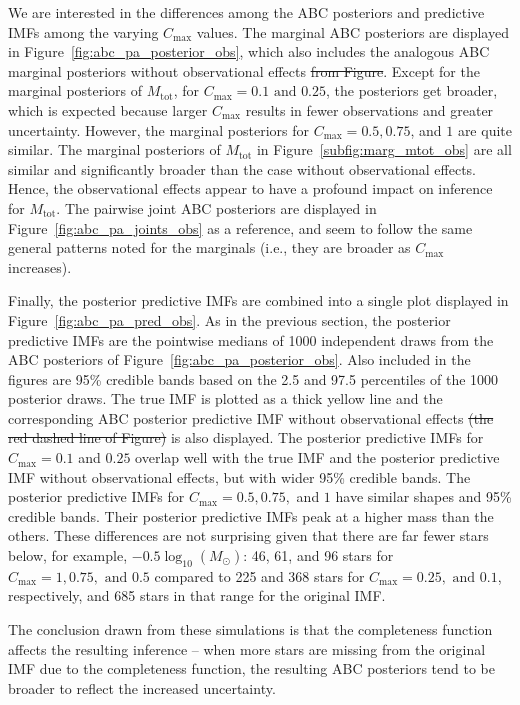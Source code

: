 \documentclass[ejs]{imsart}
\numberwithin{equation}{section}
\theoremstyle{plain}
\newcommand{\remove}[1]{\st{#1}}
\newcommand{\Msun}{M_{\odot}}
\newcommand{\Cmax}{C_{\text{max}}}
\newcommand{\Mtot}{M_{\text{tot}}}
\begin{document}
We are interested in the differences among the ABC posteriors and predictive IMFs among the varying $\Cmax$ values.  
The marginal ABC posteriors are displayed in Figure~\ref{fig:abc_pa_posterior_obs}, which also includes the analogous ABC marginal posteriors without observational effects \remove{from Figure}.  
Except for the marginal posteriors of $\Mtot$, for $\Cmax = 0.1 \text{ and } 0.25$, the posteriors get broader, which is expected because larger $\Cmax$ results in fewer observations and greater uncertainty.  
However, the marginal posteriors for $\Cmax = 0.5, 0.75$, and $1$ are quite similar. The marginal posteriors of $\Mtot$ in Figure~\ref{subfig:marg_mtot_obs} are all similar and significantly broader than the case without observational effects.  Hence, the observational effects appear to have a profound impact on inference for $\Mtot$.  The pairwise joint ABC posteriors are displayed in Figure~\ref{fig:abc_pa_joints_obs} as a reference, and seem to follow the same general patterns noted for the marginals (i.e., they are broader as $\Cmax$ increases).

Finally, the posterior predictive IMFs are combined into a single plot displayed in Figure~\ref{fig:abc_pa_pred_obs}.  As in the previous section, the posterior predictive IMFs are the pointwise medians of 1000 independent draws from the ABC posteriors of Figure~\ref{fig:abc_pa_posterior_obs}.  Also included in the figures are 95\% credible bands based on the 2.5 and 97.5 percentiles of the 1000 posterior draws.  The true IMF is plotted as a thick yellow line and the corresponding ABC posterior predictive IMF without observational effects \remove{(the red dashed line of Figure)} is also displayed.
The posterior predictive IMFs for $\Cmax = 0.1$ and $0.25$ overlap well with the true IMF and the posterior predictive IMF without observational effects, but with wider 95\% credible bands.
The posterior predictive IMFs for $\Cmax = 0.5, 0.75,$ and $1$ have similar shapes and 95\% credible bands.  
Their posterior predictive IMFs peak at a higher mass than the others.  These differences are not surprising given that there are far fewer stars below, for example, $-0.5 \log_{10}(\Msun)$:  
46, 61, and 96 stars for $\Cmax = 1, 0.75, \text{ and } 0.5$ compared to 225 and 368 stars for $\Cmax = 0.25, \text{ and } 0.1$, respectively, and 685 stars in that range for the original IMF.

The conclusion drawn from these simulations is that the completeness function affects the resulting inference -- when more stars are missing from the original IMF due to the completeness function, the resulting ABC posteriors tend to be broader to reflect the increased uncertainty. 
\end{document}
